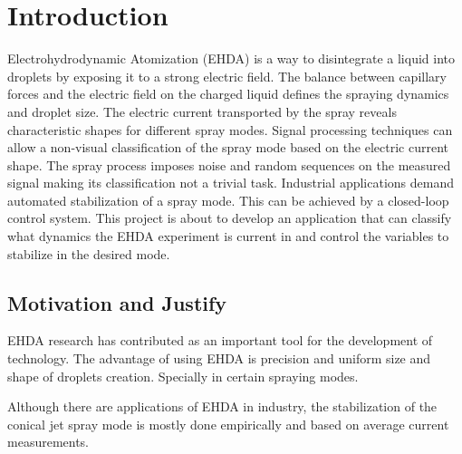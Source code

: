 \chapter{Introduction}
\label{chap:intro} 

Electrohydrodynamic Atomization (EHDA) is a way to disintegrate a liquid into droplets by exposing it to a strong electric field.\cite{prunet}
The balance between capillary forces and the electric field on the charged liquid defines the spraying dynamics and droplet size.
The electric current transported by the spray reveals characteristic shapes for different spray modes.
Signal processing techniques can allow a non-visual classification of the spray mode based on the electric current shape.\cite{Sjaaks}
The spray process imposes noise and random sequences on the measured signal making its classification not a trivial task. 
Industrial applications demand automated stabilization of a spray mode. 
This can be achieved by a closed-loop control system. 
This project is about to develop an application that can classify what dynamics the EHDA experiment is current in and control the variables to stabilize in the desired mode. 


\section{Motivation and Justify}
\label{sec:motivacao}


EHDA research has contributed as an important tool for the development of technology. 
The advantage of using EHDA is precision and uniform size and shape of droplets creation. Specially in certain spraying modes.

Although there are applications of EHDA in industry, the stabilization of the conical jet spray mode is mostly done empirically and based on average current measurements.

